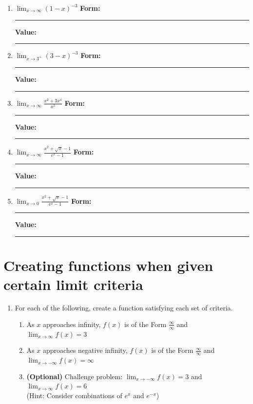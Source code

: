 \documentclass[10pt]{article}
\begin{document}
\begin{enumerate}
\begin{enumerate}
    \item[(d)] $\displaystyle\lim_{x \rightarrow \infty} (1-x)^{-3}$ \hfill {\bf Form:}\rule[-8pt]{0.5in}{0.4pt} \hfill {\bf Value:}\rule[-8pt]{0.5in}{0.4pt}
        \vfill

    \item[(e)] $\displaystyle\lim_{x \rightarrow 3^+} (3-x)^{-3}$ \hfill {\bf Form:}\rule[-8pt]{0.5in}{0.4pt} \hfill {\bf Value:}\rule[-8pt]{0.5in}{0.4pt}
        \vfill

    \item[(f)] $\displaystyle\lim_{x \rightarrow \infty} \frac{x^2 + 3x^4}{x^5}$ \hfill {\bf Form:}\rule[-8pt]{0.5in}{0.4pt} \hfill {\bf Value:}\rule[-8pt]{0.5in}{0.4pt}
        \vfill


    \item[(g)] $\displaystyle\lim_{x\to\infty}\frac{x^2+\sqrt{x}-1}{e^x-1}$ \hfill {\bf Form:}\rule[-8pt]{0.5in}{0.4pt} \hfill {\bf Value:}\rule[-8pt]{0.5in}{0.4pt}
        \vfill

    \item[(h)] $\displaystyle\lim_{x\to0}\frac{x^2+\sqrt{x}-1}{e^x-1}$ \hfill {\bf Form:}\rule[-8pt]{0.5in}{0.4pt} \hfill {\bf Value:}\rule[-8pt]{0.5in}{0.4pt}
        \vfill
    \end{enumerate}
\end{enumerate}

\newpage%

\section{Creating functions when given certain limit criteria}

\begin{enumerate}
\item[2.]\reversemarginpar{} For each of the following, create a function satisfying each set of criteria.
    \begin{enumerate}
    \item[(a)] As $x$ approaches infinity, $f(x)$ is of the Form $\frac \infty \infty$ and $\lim_{x\to \infty}f(x) = 3$
        \vfill

    \item[(b)] As $x$ approaches negative infinity, $f(x)$ is of the Form $\frac \infty \infty$ and $\lim_{x\to -\infty}f(x) = \infty$ 
        \vfill

    \item[(c)] \textbf{(Optional)} Challenge problem: $\lim_{x\to -\infty}f(x) = 3$ and $\lim_{x\to \infty}f(x) = 6$ \\(Hint: Consider combinations of $e^x$ and $e^{-x}$)
        \vfill
    \end{enumerate}
\end{enumerate}
\end{document}
